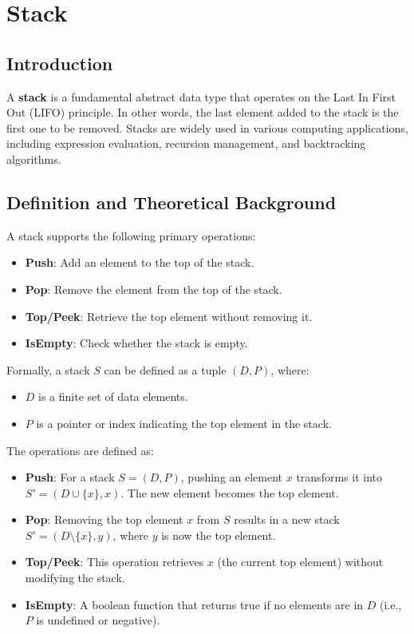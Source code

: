 \chapter{Stack}

\section{Introduction}
A \textbf{stack} is a fundamental abstract data type that operates on the Last In First Out (LIFO) principle. In other words, the last element added to the stack is the first one to be removed. Stacks are widely used in various computing applications, including expression evaluation, recursion management, and backtracking algorithms.

\section{Definition and Theoretical Background}
A stack supports the following primary operations:
\begin{itemize}
    \item \textbf{Push}: Add an element to the top of the stack.
    \item \textbf{Pop}: Remove the element from the top of the stack.
    \item \textbf{Top/Peek}: Retrieve the top element without removing it.
    \item \textbf{IsEmpty}: Check whether the stack is empty.
\end{itemize}

Formally, a stack \( S \) can be defined as a tuple \( (D, P) \), where:
\begin{itemize}
    \item \( D \) is a finite set of data elements.
    \item \( P \) is a pointer or index indicating the top element in the stack.
\end{itemize}

The operations are defined as:
\begin{itemize}
    \item \textbf{Push}: For a stack \( S = (D, P) \), pushing an element \( x \) transforms it into \( S' = (D \cup \{x\}, x) \). The new element becomes the top element.
    \item \textbf{Pop}: Removing the top element \( x \) from \( S \) results in a new stack \( S' = (D \setminus \{x\}, y) \), where \( y \) is now the top element.
    \item \textbf{Top/Peek}: This operation retrieves \( x \) (the current top element) without modifying the stack.
    \item \textbf{IsEmpty}: A boolean function that returns true if no elements are in \( D \) (i.e., \( P \) is undefined or negative).
\end{itemize}

